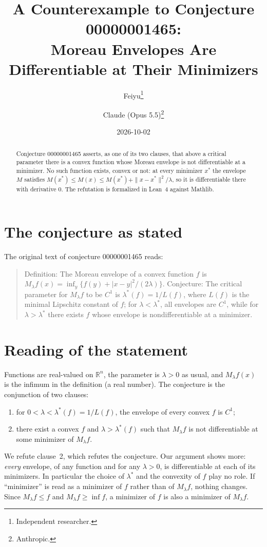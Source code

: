 \documentclass[11pt]{article}
\title{A Counterexample to Conjecture 00000001465:\\
Moreau Envelopes Are Differentiable at Their Minimizers}
\author{%
  Feiyu\thanks{Independent researcher.}
  \and
  Claude (Opus 5.5)\thanks{Anthropic.}%
}
\date{2026-10-02}
\theoremstyle{plain}
\theoremstyle{definition}
\theoremstyle{remark}
\begin{document}
\maketitle

\begin{abstract}
Conjecture 00000001465 asserts, as one of its two clauses, that above a
critical parameter there is a convex function whose Moreau envelope is not
differentiable at a minimizer. No such function exists, convex or not: at every
minimizer $x^\ast$ the envelope $M$ satisfies
$M(x^\ast)\le M(x)\le M(x^\ast)+\|x-x^\ast\|^2/\lambda$, so it is differentiable
there with derivative $0$. The refutation is formalized in Lean~4 against
Mathlib.
\end{abstract}

\section{The conjecture as stated}

The original text of conjecture 00000001465 reads:

\begin{quote}
Definition: The Moreau envelope of a convex function $f$ is
$M_\lambda f(x) = \inf_y\{f(y) + |x-y|^2/(2\lambda)\}$. Conjecture: The critical
parameter for $M_\lambda f$ to be $C^1$ is $\lambda^\ast(f) = 1/L(f)$, where
$L(f)$ is the minimal Lipschitz constant of $f$; for $\lambda < \lambda^\ast$,
all envelopes are $C^1$, while for $\lambda > \lambda^\ast$ there exists $f$
whose envelope is nondifferentiable at a minimizer.
\end{quote}

\section{Reading of the statement}

Functions are real-valued on $\mathbb R^n$, the parameter is $\lambda>0$ as
usual, and $M_\lambda f(x)$ is the infimum in the definition (a real number).
The conjecture is the conjunction of two clauses:
\begin{enumerate}
  \item for $0<\lambda<\lambda^\ast(f)=1/L(f)$, the envelope of every convex $f$ is
    $C^1$;
  \item there exist a convex $f$ and $\lambda>\lambda^\ast(f)$ such that
    $M_\lambda f$ is not differentiable at some minimizer of $M_\lambda f$.
\end{enumerate}
We refute clause~2, which refutes the conjecture. Our argument shows more:
\emph{every} envelope, of any function and for any $\lambda>0$, is
differentiable at each of its minimizers. In particular the choice of
$\lambda^\ast$ and the convexity of $f$ play no role. If ``minimizer'' is read
as a minimizer of $f$ rather than of $M_\lambda f$, nothing changes. Since
$M_\lambda f\le f$ and $M_\lambda f\ge\inf f$, a minimizer of $f$ is also a
minimizer of $M_\lambda f$.
\end{document}
